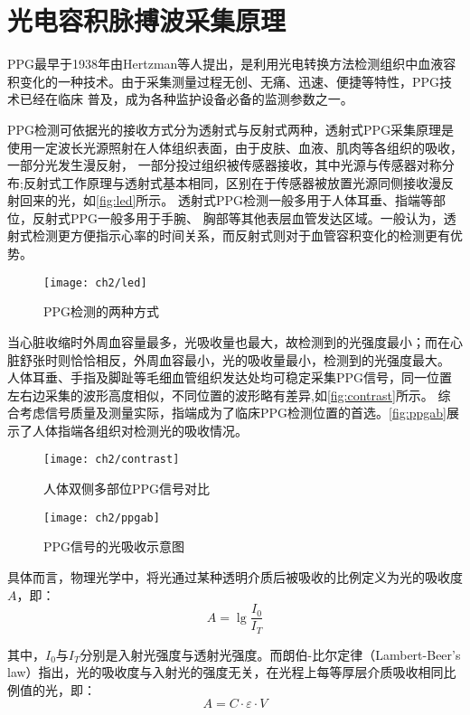 \section{光电容积脉搏波采集原理}
PPG最早于1938年由Hertzman等人提出，是利用光电转换方法检测组织中血液容积变化的一种技术。由于采集测量过程无创、无痛、迅速、便捷等特性，PPG技术已经在临床
普及，成为各种监护设备必备的监测参数之一\cite{ldl,lhc}。

PPG检测可依据光的接收方式分为透射式与反射式两种\cite{THOCBPM}，透射式PPG采集原理是使用一定波长光源照射在人体组织表面，由于皮肤、血液、肌肉等各组织的吸收，一部分光发生漫反射，
一部分投过组织被传感器接收，其中光源与传感器对称分布;反射式工作原理与透射式基本相同，区别在于传感器被放置光源同侧接收漫反射回来的光\cite{THOCBPM,mmt}，如\autoref{fig:led}所示。
透射式PPG检测一般多用于人体耳垂、指端等部位，反射式PPG一般多用于手腕、
胸部等其他表层血管发达区域\cite{THOCBPM}。一般认为，透射式检测更方便指示心率的时间关系，而反射式则对于血管容积变化的检测更有优势\cite{mmt}。
\begin{figure}[htb]
    \centering
    \texttt{[image: ch2/led]}
    \caption{\label{fig:led}PPG检测的两种方式}
\end{figure}

当心脏收缩时外周血容量最多，光吸收量也最大，故检测到的光强度最小；而在心脏舒张时则恰恰相反，外周血容最小，光的吸收量最小，检测到的光强度最大\cite{lhc,cwl}。
人体耳垂、手指及脚趾等毛细血管组织发达处均可稳定采集PPG信号，同一位置左右边采集的波形高度相似，不同位置的波形略有差异\cite{Allen2000,Allen2007},如\autoref{fig:contrast}所示。
综合考虑信号质量及测量实际，指端成为了临床PPG检测位置的首选\cite{cwl}。\autoref{fig:ppgab}展示了人体指端各组织对检测光的吸收情况。
\begin{figure}[htbp]
    \centering
    \texttt{[image: ch2/contrast]}
    \caption{\label{fig:contrast}人体双侧多部位PPG信号对比}
\end{figure}
\begin{figure}[htb]
    \centering
    \texttt{[image: ch2/ppgab]}
    \caption{\label{fig:ppgab}PPG信号的光吸收示意图}
\end{figure}

具体而言，物理光学中，将光通过某种透明介质后被吸收的比例定义为光的吸收度$A$，即：
\begin{equation}
    \label{equ:LBL}
    A=\lg\frac{I_{0}}{I_{T}}
\end{equation}

其中，$I_{0}$与$I_{T}$分别是入射光强度与透射光强度。而朗伯-比尔定律（Lambert-Beer's law）指出，光的吸收度与入射光的强度无关，在光程上每等厚层介质吸收相同比例值的光，即：
\begin{equation}
    \label{equ:LBL2}
    A=C \cdot \varepsilon \cdot V
\end{equation}

